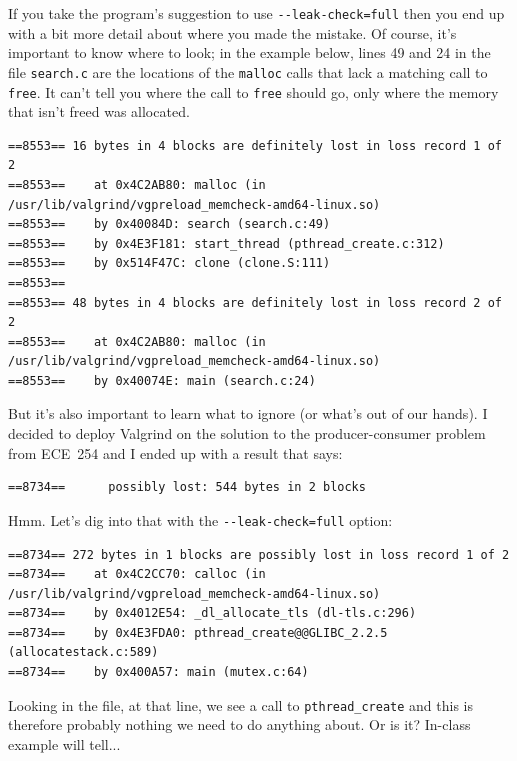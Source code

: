 \documentclass[a4paper]{report}
\begin{document}
If you take the program's suggestion to use \verb+--leak-check=full+ then you end up with a bit more detail about where you made the mistake. Of course, it's important to know where to look; in the example below, lines 49 and 24 in the file \texttt{search.c} are the locations of the \texttt{malloc} calls that lack a matching call to \texttt{free}. It can't tell you where the call to \texttt{free} should go, only where the memory that isn't freed was allocated.

\begin{verbatim}
==8553== 16 bytes in 4 blocks are definitely lost in loss record 1 of 2
==8553==    at 0x4C2AB80: malloc (in /usr/lib/valgrind/vgpreload_memcheck-amd64-linux.so)
==8553==    by 0x40084D: search (search.c:49)
==8553==    by 0x4E3F181: start_thread (pthread_create.c:312)
==8553==    by 0x514F47C: clone (clone.S:111)
==8553== 
==8553== 48 bytes in 4 blocks are definitely lost in loss record 2 of 2
==8553==    at 0x4C2AB80: malloc (in /usr/lib/valgrind/vgpreload_memcheck-amd64-linux.so)
==8553==    by 0x40074E: main (search.c:24)

\end{verbatim}

But it's also important to learn what to ignore (or what's out of our hands). I decided to deploy Valgrind on the solution to the producer-consumer problem from ECE~254 and I ended up with a result that says:

\begin{verbatim}
==8734==      possibly lost: 544 bytes in 2 blocks
\end{verbatim}

Hmm. Let's dig into that with the \verb+--leak-check=full+ option:

\begin{verbatim}
==8734== 272 bytes in 1 blocks are possibly lost in loss record 1 of 2
==8734==    at 0x4C2CC70: calloc (in /usr/lib/valgrind/vgpreload_memcheck-amd64-linux.so)
==8734==    by 0x4012E54: _dl_allocate_tls (dl-tls.c:296)
==8734==    by 0x4E3FDA0: pthread_create@@GLIBC_2.2.5 (allocatestack.c:589)
==8734==    by 0x400A57: main (mutex.c:64)
\end{verbatim}

Looking in the file, at that line, we see a call to \texttt{pthread\_create} and this is therefore probably nothing we need to do anything about. Or is it? In-class example will tell...
\end{document}
